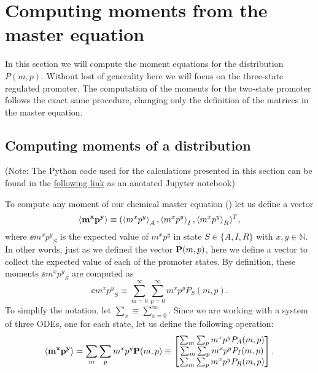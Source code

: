 \section{Computing moments from the master equation}\label{supp_moments}

In this section we will compute the moment equations for the distribution  $P(m,
p)$. Without lost of generality here we will focus on the three-state
regulated promoter. The computation of the moments for the two-state promoter
follows the exact same procedure, changing only the definition of the matrices 
in the master equation.

\subsection{Computing moments of a distribution}

(Note: The Python code used for the calculations presented in this section can
be found in the
\href{https://www.rpgroup.caltech.edu//chann_cap/software/moment_dynamics_system.html}{following
link} as an anotated Jupyter notebook)

To compute any moment of our chemical master equation ()
let us define a vector
\begin{equation}
  \left\langle \mathbf{m^x p^y} \right\rangle \equiv (\left\langle m^x p^y \right\rangle_A, \left\langle m^x p^y \right\rangle_I, \left\langle m^x p^y \right\rangle_R)^T,
\end{equation}
where $\ee{m^x p^y}_S$ is the expected value of $m^x p^y$ in state $S \in \{A,
I, R\}$ with $x, y \in \mathbb{N}$. In other words, just as we defined the
vector $\mathbf{P}(m, p)$, here we define a vector to collect the expected value of
each of the promoter states. By definition, these moments $\ee{m^x p^y}_S$ are
computed as
\begin{equation}
  \ee{m^x p^y}_S \equiv \sum_{m=0}^\infty \sum_{p=0}^\infty m^x p^y P_S(m, p).
  \label{seq_mom_def}
\end{equation}
To simplify the notation, let $\sum_x \equiv \sum_{x=0}^\infty$. Since we are
working with a system of three ODEs, one for each state, let us define the
following operation:
\begin{equation}
  \left\langle \mathbf{m^x p^y} \right\rangle =
  \sum_m \sum_p m^x p^y \mathbf{P}(m, p) \equiv
  \begin{bmatrix}
    \sum_m \sum_p m^x p^y P_A(m, p)\\
    \sum_m \sum_p m^x p^y P_I(m, p)\\
    \sum_m \sum_p m^x p^y P_R(m, p)\\
  \end{bmatrix}.
\end{equation}

